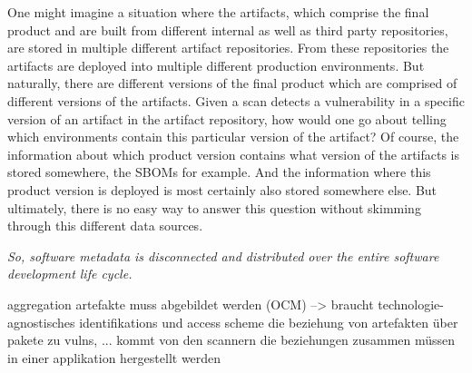 One might imagine a situation where the artifacts, which comprise the final product and are built from different internal as well as third party repositories, are stored in multiple different artifact repositories. From these repositories the artifacts are deployed into multiple different production environments. But naturally, there are different versions of the final product which are comprised of different versions of the artifacts. Given a scan detects a vulnerability in a specific version of an artifact in the artifact repository, how would one go about telling which environments contain this particular version of the artifact? Of course, the information about which product version contains what version of the artifacts is stored somewhere, the SBOMs for example. And the information where this product version is deployed is most certainly also stored somewhere else. But ultimately, there is no easy way to answer this question without skimming through this different data sources.\par
\emph{So, software metadata is disconnected and distributed over the entire software development life cycle.}

aggregation artefakte muss abgebildet werden (OCM)
--> braucht technologie-agnostisches identifikations und access scheme
die beziehung von artefakten über pakete zu vulns, ... kommt von den scannern
die beziehungen zusammen müssen in einer applikation hergestellt werden 
